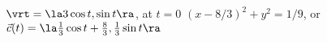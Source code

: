 {$\vrt = \la 3\cos t, \sin t\ra$, at $t=0$
}
{$(x-8/3)^2+y^2 = 1/9$, or $\vec c(t) = \la \frac13\cos t+\frac83, \frac13\sin t\ra$ 
}